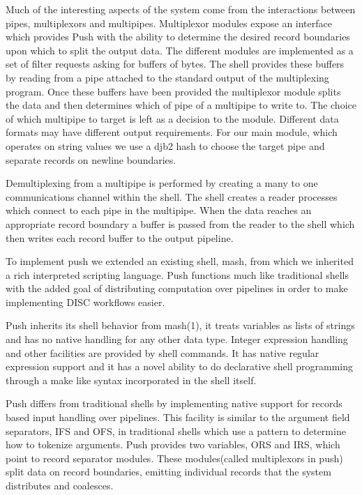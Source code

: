 \documentclass[11pt, letterpaper]{article}
\begin{document}
Much of the interesting aspects of the system come from the interactions between pipes, multiplexors and multipipes.
Multiplexor modules expose an interface which provides Push with the ability to determine the desired record boundaries upon which to split the output data. The different modules are implemented as a set of filter requests asking for buffers of bytes. The shell provides these buffers by reading from a pipe attached to the standard output of the multiplexing program. Once these buffers have been provided the multiplexor module splits the data and then determines which of pipe of a multipipe to write to. The choice of which multipipe to target is left as a decision to the module. Different data formats may have different output requirements. For our main module, which operates on string values we use a djb2 hash to choose the target pipe and separate records on newline boundaries.

Demultiplexing from a multipipe is performed by creating a many to one communications channel within the shell. The shell creates a reader processes which connect to each pipe in the multipipe. When the data reaches an appropriate record boundary a buffer is passed from the reader to the shell which then writes each record buffer to the output pipeline. 

To implement push we extended an existing shell, mash\cite{mashman}, from which we inherited a rich interpreted scripting language. Push functions much like traditional shells with the added goal of distributing computation over pipelines in order to make implementing DISC workflows easier. 

Push inherits its shell behavior from mash(1), it treats variables as lists of strings and has no native handling for any other data type. Integer expression handling and other facilities are provided by shell commands. It has native regular expression support and it has a novel ability to do declarative shell programming through a make like syntax incorporated in the shell itself.

Push differs from traditional shells by implementing native support for records based input handling over pipelines. This facility is similar to the argument field separators, IFS and OFS, in traditional shells which use a pattern to determine how to tokenize arguments. Push provides two variables, ORS and IRS, which point to record separator modules. These modules(called multiplexors in push) split data on record boundaries,  emitting individual records that the system distributes and coalesces. 
\end{document}
